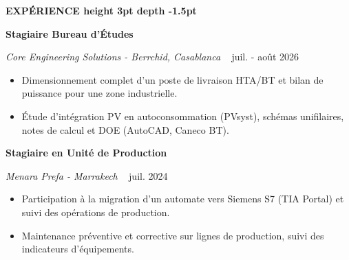 \documentclass[10pt,a4paper]{altacv}
\renewcommand{\cvsection}[2][]{%
  \vspace{4pt}%
  {\color{heading}\Large\bfseries #2 \hspace{0.2em}\leaders\vrule height 3pt depth -1.5pt\hfill\mbox{}}\par\vspace{3pt}
}
\renewcommand{\cvevent}[4]{%
  {\normalsize\bfseries\color{accent}#1\par}\vspace{1pt}
  \ifstrequal{#2}{}{}{%
    {\small\itshape\color{emphasis}#2\ifstrequal{#4}{}{}{ - #4}}%
  }%
  ~\hfill
  \ifstrequal{#3}{}{}{{\small\color{emphasis}#3}}%
  \par\vspace{2pt}
}
\begin{document}
\cvsection{EXPÉRIENCE}
\cvevent{Stagiaire Bureau d’Études}{Core Engineering Solutions}{juil. - août 2026}{Berrchid, Casablanca}
\begin{itemize}[leftmargin=*, label=\textbullet, nosep, itemsep=1.5pt]
  \item Dimensionnement complet d’un poste de livraison HTA/BT et bilan de puissance pour une zone industrielle.
  \item Étude d’intégration PV en autoconsommation (PVsyst), schémas unifilaires, notes de calcul et DOE (AutoCAD, Caneco BT).
\end{itemize}
\vspace{2pt}
\cvevent{Stagiaire en Unité de Production}{Menara Prefa}{juil. 2024}{Marrakech}
\begin{itemize}[leftmargin=*, label=\textbullet, nosep, itemsep=1.5pt]
  \item Participation à la migration d’un automate vers Siemens S7 (TIA Portal) et suivi des opérations de production.
  \item Maintenance préventive et corrective sur lignes de production, suivi des indicateurs d’équipements.
\end{itemize}
\end{document}
